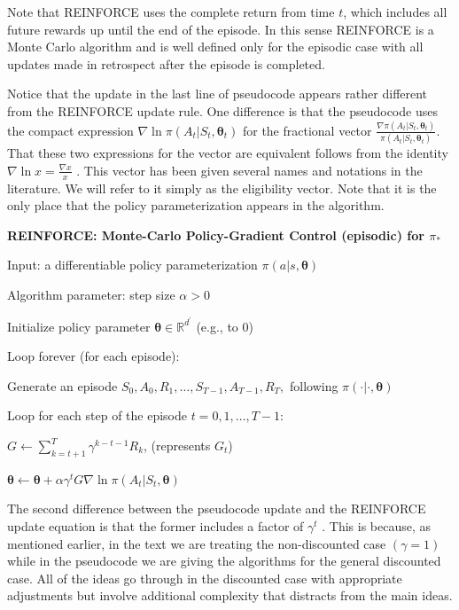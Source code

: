 \documentclass{article}
\begin{document}
Note that REINFORCE uses the complete return from time $t$, which includes all future rewards up until the end of the episode. In this sense REINFORCE is a Monte Carlo algorithm and is well defined only for the episodic case with all updates made in retrospect after the episode is completed.

Notice that the update in the last line of pseudocode appears rather different from the REINFORCE update rule. One difference is that the pseudocode uses the compact expression $\nabla \operatorname { ln } \pi ( A _ { t } | S _ { t } , \pmb { \theta } _ { t } )$ for the fractional vector $\frac { \nabla \pi ( A _ { t } | S _ { t } , \pmb { \theta } _ { t } ) } { \pi ( A _ { t } | S _ { t } , \pmb { \theta } _ { t } ) }$. 
That these two expressions for the vector are equivalent follows from the identity $\nabla \operatorname { ln } x = \frac { \nabla x } { x }$ . This vector has been given several names and notations in the literature. We will refer to it simply as the eligibility vector. Note that it is the only place that the policy parameterization appears in the algorithm.

\textbf{REINFORCE: Monte-Carlo Policy-Gradient Control (episodic) for $\pi_*$}

Input: a differentiable policy parameterization $\pi ( a | s , \pmb { \theta } )$

Algorithm parameter: step size $\alpha > 0$

Initialize policy parameter $\pmb { \theta } \in \mathbb { R } ^ { d ^ { \prime } }$ (e.g., to 0)

Loop forever (for each episode):

\hspace{.5cm} Generate an episode $S _ { 0 } , A _ { 0 } , R _ { 1 } , \ldots , S _ { T - 1 } , A _ { T - 1 } , R _ { T } ,$ following $\pi ( \cdot | \cdot , \pmb { \theta } )$

\hspace{.5cm} Loop for each step of the episode $t = 0 , 1 , \ldots , T - 1$:

\hspace{1cm} $G \gets \sum _ { k = t + 1 } ^ { T } \gamma ^ { k - t - 1 } R _ { k }$, (represents $G_t$)

\hspace{1cm} $\pmb { \theta } \leftarrow \pmb { \theta } + \alpha \gamma ^ { t } G \nabla \ln \pi ( A _ { t } | S _ { t } , \pmb { \theta } )$

The second difference between the pseudocode update and the REINFORCE update equation is that the former includes a factor of $\gamma ^ { t }$ . This is because, as mentioned earlier, 
in the text we are treating the non-discounted case $( \gamma   =   1 )$ while in the pseudocode we are giving the algorithms for the general discounted case. All of the ideas 
go through in the discounted case with appropriate adjustments but involve additional complexity that distracts from the main ideas.
\end{document}
